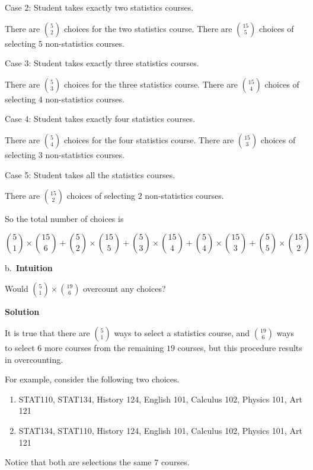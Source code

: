 \documentclass[]{book}
\providecommand{\tightlist}{%
  \setlength{\itemsep}{0pt}\setlength{\parskip}{0pt}}
\begin{document}
Case 2: Student takes exactly two statistics courses.

There are \({5 \choose 2}\) choices for the two statistics course. There
are \({15 \choose 5}\) choices of selecting \(5\) non-statistics
courses.

Case 3: Student takes exactly three statistics courses.

There are \({5 \choose 3}\) choices for the three statistics course.
There are \({15 \choose 4}\) choices of selecting \(4\) non-statistics
courses.

Case 4: Student takes exactly four statistics courses.

There are \({5 \choose 4}\) choices for the four statistics course.
There are \({15 \choose 3}\) choices of selecting \(3\) non-statistics
courses.

Case 5: Student takes all the statistics courses.

There are \({15 \choose 2}\) choices of selecting \(2\) non-statistics
courses.

So the total number of choices is

\[{5 \choose 1} \times {15 \choose 6} + {5 \choose 2} \times {15 \choose 5} + {5 \choose 3} \times {15 \choose 4} + {5 \choose 4} \times {15 \choose 3} + {5 \choose 5} \times {15 \choose 2}\]

b.~\textbf{Intuition}

Would \({5 \choose 1} \times {19 \choose 6}\) overcount any choices?

 \textbf{Solution}

It is true that there are \({5 \choose 1}\) ways to select a statistics
course, and \({19 \choose 6}\) ways to select \(6\) more courses from
the remaining \(19\) courses, but this procedure results in
overcounting.

For example, consider the following two choices.

\begin{enumerate}
\def\labelenumi{\alph{enumi}.}
\tightlist
\item
  STAT110, STAT134, History 124, English 101, Calculus 102, Physics 101,
  Art 121
\item
  STAT134, STAT110, History 124, English 101, Calculus 102, Physics 101,
  Art 121
\end{enumerate}

Notice that both are selections the same \(7\) courses.

\subsection{}\label{section-10}
\end{document}
